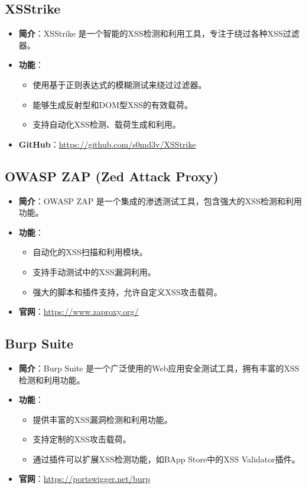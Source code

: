\documentclass{article}
\begin{document}
\subsection{XSStrike}
\begin{itemize}
\item \textbf{简介}：XSStrike 是一个智能的XSS检测和利用工具，专注于绕过各种XSS过滤器。
\item \textbf{功能}：
\begin{itemize}
\item 使用基于正则表达式的模糊测试来绕过过滤器。
\item 能够生成反射型和DOM型XSS的有效载荷。
\item 支持自动化XSS检测、载荷生成和利用。
\end{itemize}
\item \textbf{GitHub}：\url{https://github.com/s0md3v/XSStrike}
\end{itemize}

\subsection{OWASP ZAP (Zed Attack Proxy)}
\begin{itemize}
\item \textbf{简介}：OWASP ZAP 是一个集成的渗透测试工具，包含强大的XSS检测和利用功能。
\item \textbf{功能}：
\begin{itemize}
\item 自动化的XSS扫描和利用模块。
\item 支持手动测试中的XSS漏洞利用。
\item 强大的脚本和插件支持，允许自定义XSS攻击载荷。
\end{itemize}
\item \textbf{官网}：\url{https://www.zaproxy.org/}
\end{itemize}

\subsection{Burp Suite}
\begin{itemize}
\item \textbf{简介}：Burp Suite 是一个广泛使用的Web应用安全测试工具，拥有丰富的XSS检测和利用功能。
\item \textbf{功能}：
\begin{itemize}
\item 提供丰富的XSS漏洞检测和利用功能。
\item 支持定制的XSS攻击载荷。
\item 通过插件可以扩展XSS检测功能，如BApp Store中的XSS Validator插件。
\end{itemize}
\item \textbf{官网}：\url{https://portswigger.net/burp}
\end{itemize}
\end{document}
